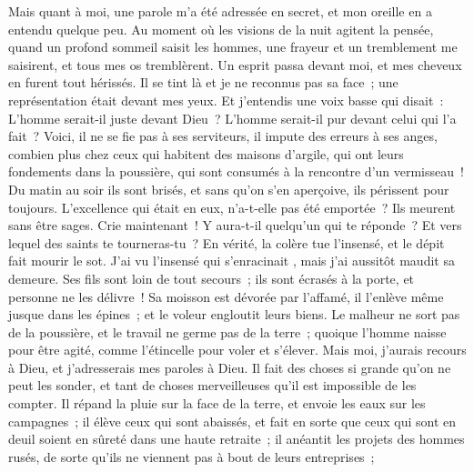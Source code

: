 \begin{multicols}{2}
Mais quant à moi, une parole m'a été adressée en secret, et mon oreille en a entendu quelque peu.
Au moment où les visions de la nuit agitent la pensée, quand un profond sommeil saisit les hommes,
une frayeur et un tremblement me saisirent, et tous mes os tremblèrent.
Un esprit passa devant moi, et mes cheveux en furent tout hérissés.
Il se tint là et je ne reconnus pas sa face~; une représentation était devant mes yeux. Et j'entendis une voix basse qui disait~:
L'homme serait-il juste devant Dieu~? L'homme serait-il pur devant celui qui l'a fait~?
Voici, il ne se fie pas à ses serviteurs, il impute des erreurs à ses anges,
combien plus chez ceux qui habitent des maisons d'argile, qui ont leurs fondements dans la poussière, qui sont consumés à la rencontre d'un vermisseau~!
Du matin au soir ils sont brisés, et sans qu'on s'en aperçoive, ils périssent pour toujours.
L'excellence qui était en eux, n'a-t-elle pas été emportée~? Ils meurent sans être sages.
\VerseOne{}Crie maintenant~! Y aura-t-il quelqu'un qui te réponde~? Et vers lequel des saints te tourneras-tu~?
En vérité, la colère tue l'insensé, et le dépit fait mourir le sot.
J'ai vu l'insensé qui s'enracinait , mais j'ai aussitôt maudit sa demeure.
Ses fils sont loin de tout secours~; ils sont écrasés à la porte, et personne ne les délivre~!
Sa moisson est dévorée par l'affamé, il l'enlève même jusque dans les épines~; et le voleur engloutit leurs biens.
Le malheur ne sort pas de la poussière, et le travail ne germe pas de la terre~;
quoique l'homme naisse pour être agité, comme l'étincelle pour voler et s'élever.
Mais moi, j'aurais recours à Dieu, et j'adresserais mes paroles à Dieu.
Il fait des choses si grande qu'on ne peut les sonder, et tant de choses merveilleuses qu'il est impossible de les compter.
Il répand la pluie sur la face de la terre, et envoie les eaux sur les campagnes~;
il élève ceux qui sont abaissés, et fait en sorte que ceux qui sont en deuil soient en sûreté dans une haute retraite~;
il anéantit les projets des hommes rusés, de sorte qu'ils ne viennent pas à bout de leurs entreprises~;

\end{multicols}
